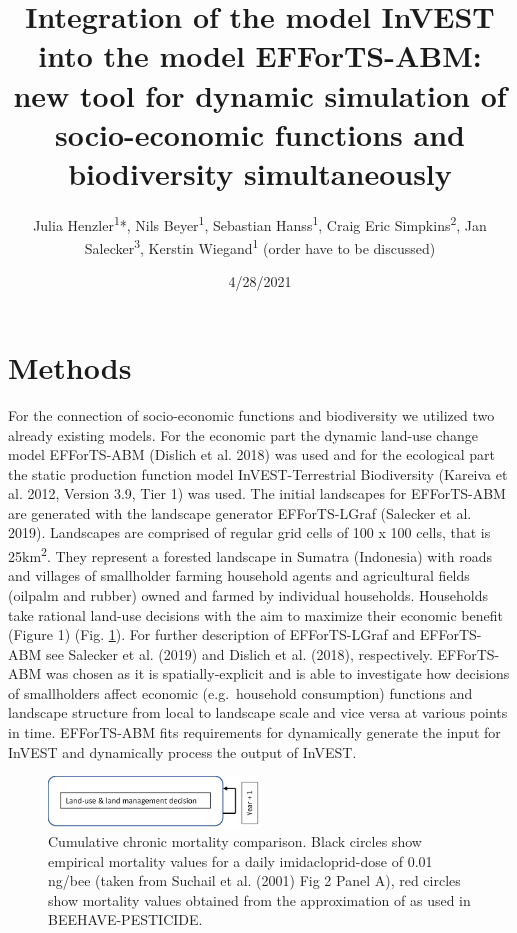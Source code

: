 \documentclass[
]{article}
\title{Integration of the model InVEST into the model EFForTS-ABM: new
tool for dynamic simulation of socio-economic functions and biodiversity
simultaneously}
\author{Julia Henzler\textsuperscript{1}*, Nils
Beyer\textsuperscript{1}, Sebastian Hanss\textsuperscript{1}, Craig Eric
Simpkins\textsuperscript{2}, Jan Salecker\textsuperscript{3}, Kerstin
Wiegand\textsuperscript{1} (order have to be discussed)}
\date{4/28/2021}
\begin{document}
\maketitle

\hypertarget{methods}{%
\section{Methods}\label{methods}}

For the connection of socio-economic functions and biodiversity we
utilized two already existing models. For the economic part the dynamic
land-use change model EFForTS-ABM (Dislich et al. 2018) was used and for
the ecological part the static production function model
InVEST-Terrestrial Biodiversity (Kareiva et al. 2012, Version 3.9, Tier
1) was used. The initial landscapes for EFForTS-ABM are generated with
the landscape generator EFForTS-LGraf (Salecker et al. 2019). Landscapes
are comprised of regular grid cells of 100 x 100 cells, that is
25km\textsuperscript{2}. They represent a forested landscape in Sumatra
(Indonesia) with roads and villages of smallholder farming household
agents and agricultural fields (oilpalm and rubber) owned and farmed by
individual households. Households take rational land-use decisions with
the aim to maximize their economic benefit (Figure 1) (Fig.
\ref{fig:economic}). For further description of EFForTS-LGraf and
EFForTS-ABM see Salecker et al. (2019) and Dislich et al. (2018),
respectively. EFForTS-ABM was chosen as it is spatially-explicit and is
able to investigate how decisions of smallholders affect economic
(e.g.~household consumption) functions and landscape structure from
local to landscape scale and vice versa at various points in time.
EFForTS-ABM fits requirements for dynamically generate the input for
InVEST and dynamically process the output of InVEST.

\begin{figure}[h!]
  \includegraphics[width=0.5\textwidth]{"figures/png/Economic_simple.png"}
  \caption{Cumulative chronic mortality comparison. Black circles show empirical mortality values for a daily imidacloprid-dose of 0.01 ng/bee (taken from Suchail et al. (2001) Fig 2 Panel A), red circles show mortality values obtained from the approximation of as used in BEEHAVE-PESTICIDE.}
  \label{fig:economic}
\end{figure}
\end{document}

